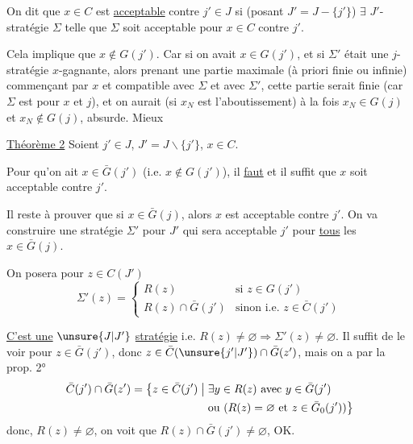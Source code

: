 

On dit que \uline{$x$}$\in C$ est \uline{acceptable} contre $j'\in J$  si \deleted{$\exists$} (posant $J'=J-\{j'\}$) $\exists$ $J'$-stratégie $\Sigma$ telle que $\Sigma$ soit acceptable pour $x\in C$ contre $j'$.


Cela implique que $x\notin G(j')$. Car si on avait $x\in G(j')$,  et si $\Sigma'$ était une $j$-stratégie $x$-gagnante, alors prenant une partie maximale (à priori finie ou infinie) commençant par $x$ et compatible avec $\Sigma$ et avec $\Sigma'$, cette partie serait finie (car $\Sigma$ est  pour $x$ et $j$), et on aurait (si $x_N$ est l'aboutissement) à la fois $x_N\in G(j)$ et $x_N\notin G(j)$, absurde. Mieux

\uline{Théorème 2} Soient $j'\in J$, $J'=J\smallsetminus\{j'\}$, $x\in C$.

Pour qu'on ait $x\in\bar G(j')$ (i.e. $x\notin G(j')$), il \uline{faut} et il suffit que $x$ soit acceptable contre $j'$.


Il reste à prouver que si $x\in\bar G(j)$, alors $x$ est acceptable contre $j'$. On va construire une stratégie $\Sigma'$ pour $J'$ qui sera acceptable   $j'$ pour \uline{tous} les $x\in\bar G(j)$.

On posera pour $z\in C(J')$
\[
\Sigma'(z)=\begin{cases}
R(z)&\text{si }z\in G(j')\\
R(z)\cap\bar G(j')&\text{sinon i.e. }z\in\bar C(j')
\end{cases}
\]

\uline{C'est une} $\unsure{J|J'}$ \uline{stratégie} i.e. $R(z)\ne\varnothing\Rightarrow\Sigma'(z)\ne\varnothing$. Il suffit de le voir pour $z\in\bar G(j')$, donc $z\in\bar C(\unsure{j'|J'})\cap\bar G(z')$, mais on a par la prop. 2°
\[
\begin{aligned}
\bar C(j')\cap\bar G(z')=\bigl\{z\in\bar C(j')\bigm|{}&\exists y\in R(z)\text{ avec }y\in\bar G(j')\\
&\text{ou }(R(z)=\varnothing\text{ et }z\in\bar G_0(j'))\bigr\}
\end{aligned}
\]
donc,  $R(z)\ne\varnothing$, on voit que $R(z)\cap\bar G(j')\ne\varnothing$, OK.

